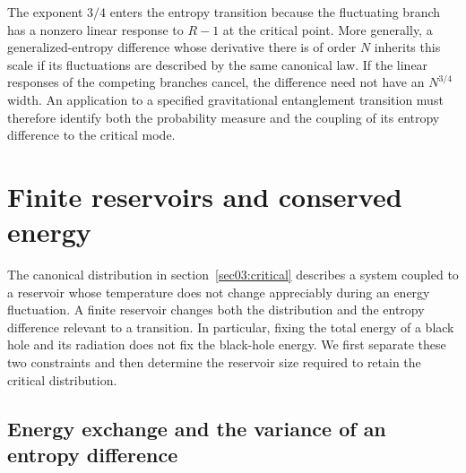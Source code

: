 \documentclass[11pt,letterpaper]{article}
\theoremstyle{plain}
\theoremstyle{definition}
\theoremstyle{remark}
\begin{document}
The exponent $3/4$ enters the entropy transition because the
fluctuating branch has a nonzero linear response to $R-1$ at the
critical point.  More generally, a generalized-entropy difference
whose derivative there is of order $N$ inherits this scale if its
fluctuations are described by the same canonical law.  If the
linear responses of the competing branches cancel, the difference
need not have an $N^{3/4}$ width.  An application to a specified
gravitational entanglement transition must therefore identify both
the probability measure and the coupling of its entropy difference
to the critical mode.

\section{Finite reservoirs and conserved energy}
\label{sec04:reservoir}

The canonical distribution in section~\ref{sec03:critical} describes a system coupled to a reservoir whose temperature does not change appreciably during an energy fluctuation. A finite reservoir changes both the distribution and the entropy difference relevant to a transition. In particular, fixing the total energy of a black hole and its radiation does not fix the black-hole energy. We first separate these two constraints and then determine the reservoir size required to retain the critical distribution.

\subsection{Energy exchange and the variance of an entropy difference}
\end{document}
